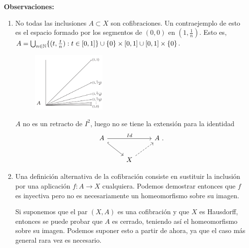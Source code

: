 \textbf{Observaciones:}
\begin{enumerate}
\item No todas las inclusiones $A \subset X$ son cofibraciones. Un contraejemplo de esto es el espacio formado por los segmentos de $(0, 0)$ en $(1, \frac{1}{n})$.
Esto es, $ A =  \bigcup_{n \in \mathbb{N}} \{ (t, \frac{t}{n}) : t \in [0,1] \} \cup \{0\} \times [0,1] \cup [0,1] \times \{0\}$. \par
\begin{figure}[h]
\centering
\includegraphics[width = 0.35\textwidth]{images/ejcofibsegmentos}
\end{figure}
$A$ no es un retracto de $I^2$, luego no se tiene la extensión para la identidad 
\[ 
\begin{tikzcd}
A \arrow{rr}{Id} \drar[hook] & & A \ . \\
 & X \urar[dashed] & 
\end{tikzcd}
\]

\item Una definición alternativa de la cofibración consiste en sustituir la inclusión por una aplicación $f : A \longrightarrow X $ cualquiera. Podemos demostrar entonces que $f$ es inyectiva pero no es necesariamente un homeomorfismo sobre su imagen. \par
Si suponemos que el par $(X, A)$ es una cofibración y que $X$ es Hausdorff, entonces se puede probar que $A$ es cerrado, teniendo así el homeomorfismo sobre su imagen. Podemos suponer esto a partir de ahora, ya que el caso más general rara vez es necesario.
\end{enumerate}


